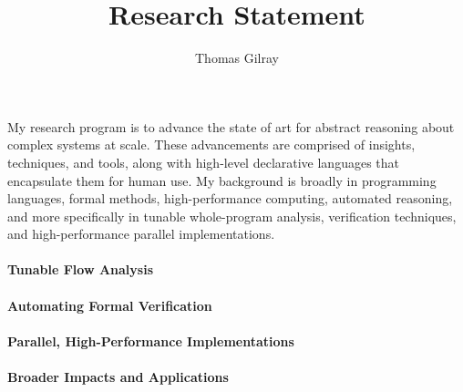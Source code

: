 \documentclass[11pt]{article}
\title{ Research Statement }
\author{ Thomas Gilray }
\date{}
\begin{document}
\maketitle	


My research program is to advance the state of art for abstract reasoning about complex systems at scale. These advancements are comprised of insights, techniques, and tools, along with high-level declarative languages that encapsulate them for human use. My background is broadly in programming languages, formal methods, high-performance computing, automated reasoning, and more specifically in tunable whole-program analysis, verification techniques, and high-performance parallel implementations.



\paragraph{Tunable Flow Analysis}
%



\paragraph{Automating Formal Verification}
%



\paragraph{Parallel, High-Performance Implementations}
%




\paragraph{Broader Impacts and Applications}
%
\end{document}
